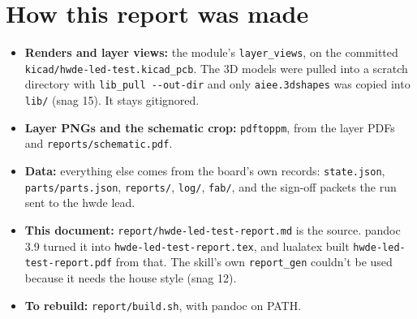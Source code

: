 \documentclass[
  10pt,
]{article}
\providecommand{\tightlist}{%
  \setlength{\itemsep}{0pt}\setlength{\parskip}{0pt}}
\begin{document}
\section{How this report was made}\label{how-this-report-was-made}

\begin{itemize}
\tightlist
\item
  \textbf{Renders and layer views:} the module's \texttt{layer\_views},
  on the committed \texttt{kicad/hwde-led-test.kicad\_pcb}. The 3D
  models were pulled into a scratch directory with
  \texttt{lib\_pull\ -\/-out-dir} and only \texttt{aiee.3dshapes} was
  copied into \texttt{lib/} (snag 15). It stays gitignored.
\item
  \textbf{Layer PNGs and the schematic crop:} \texttt{pdftoppm}, from
  the layer PDFs and \texttt{reports/schematic.pdf}.
\item
  \textbf{Data:} everything else comes from the board's own records:
  \texttt{state.json}, \texttt{parts/parts.json}, \texttt{reports/},
  \texttt{log/}, \texttt{fab/}, and the sign-off packets the run sent to
  the hwde lead.
\item
  \textbf{This document:} \texttt{report/hwde-led-test-report.md} is the
  source. pandoc 3.9 turned it into \texttt{hwde-led-test-report.tex},
  and lualatex built \texttt{hwde-led-test-report.pdf} from that. The
  skill's own \texttt{report\_gen} couldn't be used because it needs the
  house style (snag 12).
\item
  \textbf{To rebuild:} \texttt{report/build.sh}, with pandoc on PATH.
\end{itemize}
\end{document}
